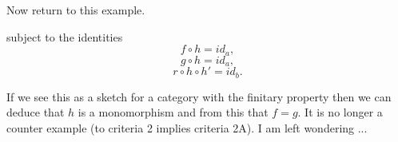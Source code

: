 \begin{frame}
Now return to this example.

subject to the identities
\begin{equation}
\label{fhidentity}
f \circ h = id_a,
\end{equation}
\begin{equation}
\label{ghidentity}
g \circ h = id_a,
\end{equation}
\begin{equation}
\label{rhhpidentity}
r \circ h \circ h' = id_b.
\end{equation}

If we see this as a sketch for a category with the finitary property then we can deduce that $h$ is a monomorphism
and from this that $f=g$.  It is no longer a counter example (to criteria 2 implies criteria 2A).
\medskip
I am left wondering ...  
\end{frame}

